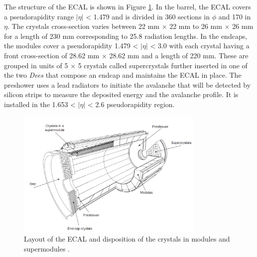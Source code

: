     The structure of the ECAL is shown in Figure \ref{fig:I-3-ecal}. In the barrel, the ECAL covers a pseudorapidity range $ | \eta | $ < 1.479 and is divided in 360 sections in $ \phi $ and 170 in $ \eta $. The crystals cross-section varies between 22 mm $ \times $ 22 mm to 26 mm $ \times $ 26 mm for a length of 230 mm corresponding to 25.8 radiation lengths. In the endcaps, the modules cover a pseudorapidity 1.479 < $ | \eta | $ < 3.0 with each crystal having a front cross-section of 28.62 mm $ \times $ 28.62 mm and a length of 220 mm. These are grouped in units of 5 $ \times $ 5 crystals called supercrystals further inserted in one of the two \emph{Dees} that compose an endcap and maintains the ECAL in place. The preshower uses a lead radiators to initiate the avalanche that will be detected by silicon strips to measure the deposited energy and the avalanche profile. It is installed in the 1.653 < $ | \eta | $ < 2.6 pseudorapidity region. \\

    \begin{figure}[h!]
      \centering
      \includegraphics[width=0.8\textwidth]{img/I-3-cms/ecal.png}
      \caption{Layout of the ECAL and disposition of the crystals in modules and supermodules \cite{1748-0221-3-08-S08004}.}
      \label{fig:I-3-ecal}
    \end{figure}

